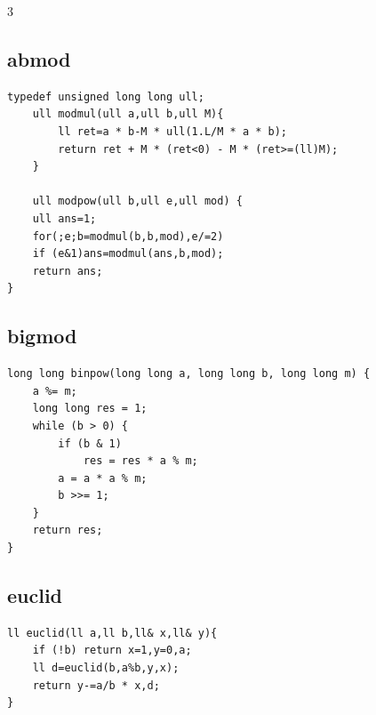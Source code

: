 \documentclass[twoside]{article}
\begin{document}
\begin{multicols*}{3}
{\subsection*{abmod}
}
\begin{verbatim}
typedef unsigned long long ull;
    ull modmul(ull a,ull b,ull M){
        ll ret=a * b-M * ull(1.L/M * a * b);
        return ret + M * (ret<0) - M * (ret>=(ll)M);
    }

    ull modpow(ull b,ull e,ull mod) {
    ull ans=1;
    for(;e;b=modmul(b,b,mod),e/=2)
    if (e&1)ans=modmul(ans,b,mod);
    return ans;
}
\end{verbatim}

{
\subsection*{bigmod}
}
\begin{verbatim}
long long binpow(long long a, long long b, long long m) {
    a %= m;
    long long res = 1;
    while (b > 0) {
        if (b & 1)
            res = res * a % m;
        a = a * a % m;
        b >>= 1;
    }
    return res;
}
\end{verbatim}

{
\subsection*{euclid}
}
\begin{verbatim}
ll euclid(ll a,ll b,ll& x,ll& y){
    if (!b) return x=1,y=0,a;
    ll d=euclid(b,a%b,y,x);
    return y-=a/b * x,d;
}
\end{verbatim}

{
}
\end{multicols*}
\end{document}
